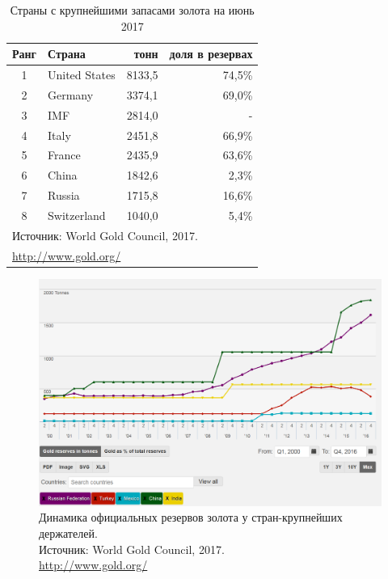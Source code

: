 \documentclass[_Banking_p3.tex]{subfiles}
\begin{document}
\begin{frame}[shrink=25]
\begin{table}[htbp]
  \centering
  \caption{Страны с крупнейшими запасами золота на июнь 2017}
    \begin{tabular}{clrr}
    \toprule
    Ранг  & Страна & тонн  & доля в резервах \\
    \midrule
    1     & United States & 8133,5 & 74,5\% \\
    2     & Germany & 3374,1 & 69,0\% \\
    3     & IMF   & 2814,0 & - \\
    4     & Italy & 2451,8 & 66,9\% \\
    5     & France & 2435,9 & 63,6\% \\
    6     & China & 1842,6 & 2,3\% \\
    7     & Russia & 1715,8 & 16,6\% \\
    8     & Switzerland & 1040,0 & 5,4\% \\
    \bottomrule
    \multicolumn{4}{l}{Источник: World Gold Council, 2017.}\\
    \multicolumn{4}{l}{\url{http://www.gold.org/}}
    \end{tabular}%
  \label{tab:addlabel}%
\end{table}%
\end{frame}

\begin{frame}
\begin{figure}	
	\centering
	\includegraphics[scale=0.25]{img/official_reserves.png}
	\caption{Динамика официальных резервов золота у стран-крупнейших держателей. \\Источник: World Gold Council, 2017.\\ \url{http://www.gold.org/}}
	\label{fig:official_reserves}
\end{figure}
\end{frame}
\end{document}
